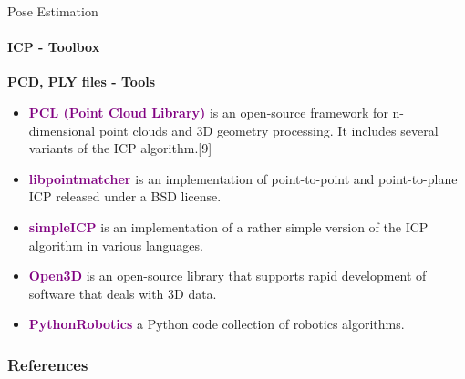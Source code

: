 \documentclass[aspectratio=169]{beamer}
\begin{document}
\begin{frame}[fragile, t]{Pose Estimation}
	\framesubtitle{ICP - Toolbox}

	\textbf{PCD, PLY files - Tools}
	\begin{itemize}
		\item \textcolor{purple}{\textbf{PCL (Point Cloud Library)}} is an open-source framework for n-dimensional point clouds and 3D geometry processing. It includes several variants of the ICP algorithm.[9]
		\item \textcolor{purple}{\textbf{libpointmatcher}} is an implementation of point-to-point and point-to-plane ICP released under a BSD license.
		\item \textcolor{purple}{\textbf{simpleICP}} is an implementation of a rather simple version of the ICP algorithm in various languages.
		\item \textcolor{purple}{\textbf{Open3D}} is an open-source library that supports rapid development of software that deals with 3D data. 
		\item \textcolor{purple}{\textbf{PythonRobotics}} a Python code collection of robotics algorithms.
	\end{itemize}

\end{frame}

 
\begin{frame}[t, allowframebreaks]
	\frametitle{References}
	
\end{frame}
\end{document}
